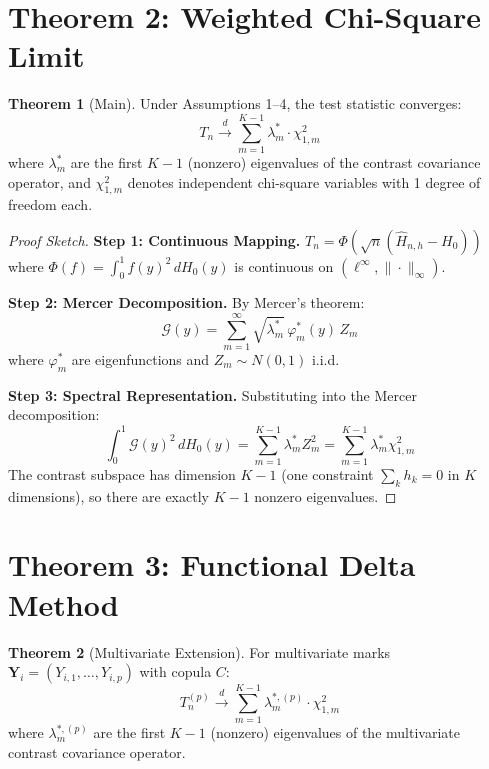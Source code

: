 \documentclass[final,3p,twocolumn,times,authoryear]{elsarticle}
\theoremstyle{definition}
\newtheorem{theorem}{Theorem}[section]
\begin{document}
\section{Theorem 2: Weighted Chi-Square Limit}
\label{sec:theorem2}

\begin{theorem}[Main]
\label{thm:chisq}
Under Assumptions 1--4, the test statistic converges:
\begin{equation}
T_n \stackrel{d}{\longrightarrow} \sum_{m=1}^{K-1} \lambda_m^* \cdot \chi^2_{1,m}
\end{equation}
where $\lambda_m^*$ are the first $K-1$ (nonzero) eigenvalues of the contrast covariance operator, and $\chi^2_{1,m}$ denotes independent chi-square variables with 1 degree of freedom each.
\end{theorem}

\begin{proof}[Proof Sketch]

\textbf{Step 1: Continuous Mapping.} $T_n = \Phi(\sqrt{n}(\hat{H}_{n,h} - H_0))$ where $\Phi(f) = \int_0^1 f(y)^2 \, dH_0(y)$ is continuous on $(\ell^\infty, \|\cdot\|_\infty)$.

\textbf{Step 2: Mercer Decomposition.} By Mercer's theorem:
\begin{equation}
\mathcal{G}(y) = \sum_{m=1}^\infty \sqrt{\lambda_m^*} \, \varphi_m^*(y) \, Z_m
\end{equation}
where $\varphi_m^*$ are eigenfunctions and $Z_m \sim N(0,1)$ i.i.d.

\textbf{Step 3: Spectral Representation.} Substituting into the Mercer decomposition:
\begin{equation}
\int_0^1 \mathcal{G}(y)^2 \, dH_0(y) = \sum_{m=1}^{K-1} \lambda_m^* Z_m^2 = \sum_{m=1}^{K-1} \lambda_m^* \chi^2_{1,m}
\end{equation}
The contrast subspace has dimension $K-1$ (one constraint $\sum_k h_k = 0$ in $K$ dimensions), so there are exactly $K-1$ nonzero eigenvalues.
\end{proof}

\section{Theorem 3: Functional Delta Method}
\label{sec:theorem3}

\begin{theorem}[Multivariate Extension]
\label{thm:delta}
For multivariate marks $\mathbf{Y}_i = (Y_{i,1}, \dots, Y_{i,p})$ with copula $C$:
\begin{equation}
T_n^{(p)} \stackrel{d}{\longrightarrow} \sum_{m=1}^{K-1} \lambda_m^{*,(p)} \cdot \chi^2_{1,m}
\end{equation}
where $\lambda_m^{*,(p)}$ are the first $K-1$ (nonzero) eigenvalues of the multivariate contrast covariance operator.
\end{theorem}
\end{document}
